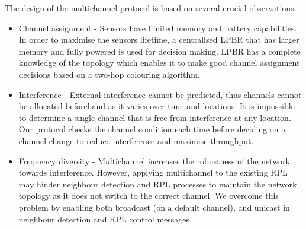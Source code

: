 The design of the multichannel protocol is based on several crucial observations:
\begin{itemize}
\item Channel assignment - Sensors have limited memory and battery capabilities. In order to maximise the sensors lifetime, a centralised LPBR that has larger memory and fully powered is used for decision making. LPBR has a complete knowledge of the topology which enables it to make good channel assignment decisions based on a two-hop colouring algorithm.

\item Interference - External interference cannot be predicted, thus channels cannot be allocated beforehand as it varies over time and locations. It is impossible to determine a single channel that is free from interference at any location. Our protocol checks the channel condition each time before deciding on a channel change to reduce interference and maximise throughput.

\item Frequency diversity - Multichannel increases the robustness of the network towards interference. However, applying multichannel to the existing RPL may hinder neighbour detection and RPL processes to maintain the network topology as it does not switch to the correct channel. We overcome this problem by enabling both broadcast (on a default channel), and unicast in neighbour detection and RPL control messages. 



\end{itemize}

